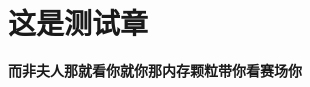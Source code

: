 \documentclass{DemoRjz}[ctexfont]
\begin{document}
   
   
   
   
   \chapter{这是测试章}

   {\bfseries 而非夫人那就看你就你那内存颗粒带你看赛场你}
   

   \toggletrue{appendix}

   \appendix

	
	
\end{document}
